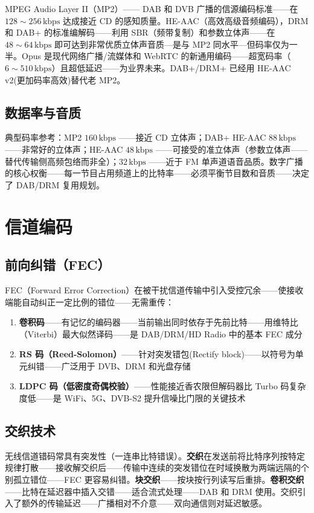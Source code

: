 \documentclass[12pt,UTF8]{ctexbook}
\begin{document}
MPEG Audio Layer II（MP2）—— DAB 和 DVB 广播的信源编码标准——在 $128\sim256\,\mathrm{kbps}$ 达成接近 CD 的感知质量。HE-AAC（高效高级音频编码），DRM 和 DAB+ 的标准编解码——利用 SBR（频带复制）和参数立体声——在 $48\sim64\,\mathrm{kbps}$ 即可达到非常优质立体声音质—是与 MP2 同水平—但码率仅为一半。Opus 是现代网络广播/流媒体和 WebRTC 的新通用编码——超宽码率（$6\sim510\,\mathrm{kbps}$）且超低延迟——为业界未来。DAB+/DRM+ 已经用 HE-AAC v2(更加码率高效)替代老 MP2。

\subsection{数据率与音质}

典型码率参考：MP2 $160\,\mathrm{kbps}$ ——接近 CD 立体声；DAB+ HE-AAC $88\,\mathrm{kbps}$ ——非常好的立体声；HE-AAC $48\,\mathrm{kbps}$ ——可接受的准立体声（参数立体声——替代传输侧高频包络而非全）；$32\,\mathrm{kbps}$ ——近于 FM 单声道语音品质。数字广播的核心权衡——每一节目占用频道上的比特率——必须平衡节目数和音质——决定了 DAB/DRM 复用规划。

\section{信道编码}
\label{sec:channel_coding}

\subsection{前向纠错（FEC）}

FEC（Forward Error Correction）在被干扰信道传输中引入受控冗余——使接收端能自动纠正一定比例的错位——无需重传：
\begin{enumerate}
\item \textbf{卷积码}——有记忆的编码器——当前输出同时依存于先前比特——用维特比（Viterbi）最大似然译码——是 DAB/DRM/HD Radio 中的基本 FEC 成分
\item \textbf{RS 码（Reed-Solomon）}——针对突发错包(Rectify block)——以符号为单元纠错——广泛用于 DVB、DRM 和光盘存储
\item \textbf{LDPC 码（低密度奇偶校验）}——性能接近香农限但解码器比 Turbo 码复杂度低——是 WiFi、5G、DVB-S2 提升信噪比门限的关键技术
\end{enumerate}

\subsection{交织技术}

无线信道错码常具有突发性（一连串比特错误）。\textbf{交织}在发送前将比特序列按特定规律打散——接收解交织后——传输中连续的突发错位在时域换散为两端远隔的个别孤立错位——FEC 更容易纠错。\textbf{块交织}——按块按行列读写后重排。\textbf{卷积交织}——比特在延迟器中插入交错——适合流式处理——DAB 和 DRM 使用。交织引入了额外的传输延迟——广播相对不介意——双向通信则对延迟敏感。
\end{document}
